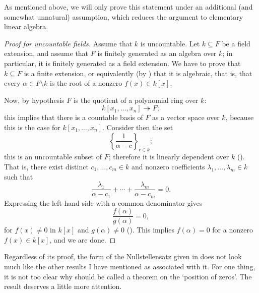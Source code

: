 As mentioned above, we will only prove this statement under an
additional (and somewhat unnatural) assumption, which reduces the
argument to elementary linear algebra.
\begin{proof}[Proof for uncountable fields]
  Assume that $k$ is uncountable. Let $k \subseteq F$ be a field
  extension, and assume that $F$ is finitely generated as an algebra
  over $k$; in particular, it is finitely generated as a field
  extension. We have to prove that $k \subseteq F$ is a finite
  extension, or equivalently (by ) that it is
  algebraic, that is, that every $\alpha \in F \setminus k$ is the
  root of a nonzero $f(x) \in k[x]$.

  Now, by hypothesis $F$ is the quotient of a polynomial ring over
  $k$:
  \[
    k[x_1, \dots, x_n] \twoheadrightarrow F;
  \]
  this implies that there is a countable basis of $F$ as a vector
  space over $k$, because this is the case for $k[x_1, \dots,
  x_n]$. Consider then the set
  \[ {\left\{ \frac{1}{\alpha - c} \right\}}_{c \in k};
  \]
  this is an uncountable subset of $F$; therefore it is linearly
  dependent over $k$ (). That is, there exist
  distinct $c_1, \dots, c_m \in k$ and nonzero coefficients
  $\lambda_1, \dots, \lambda_m \in k$ such that
  \[
    \frac{\lambda_1}{\alpha - c_1} + \cdots + \frac{\lambda_m}{\alpha
      - c_m} = 0.
  \]
  Expressing the left-hand side with a common denominator gives
  \[
    \frac{f(\alpha)}{g(\alpha)} = 0,
  \]
  for $f(x) \neq 0$ in $k[x]$ and $g(\alpha) \neq 0$
  ().  This implies
  $f(\alpha) = 0$ for a nonzero $f(x) \in k[x]$, and we are done.
\end{proof}
Regardless of its proof, the form of the Nullstellensatz given in
 does not look much like the other results I have
mentioned as associated with it. For one thing, it is not too clear
why  should be called a theorem on the `position
of zeros'. The result deserves a little more attention.

